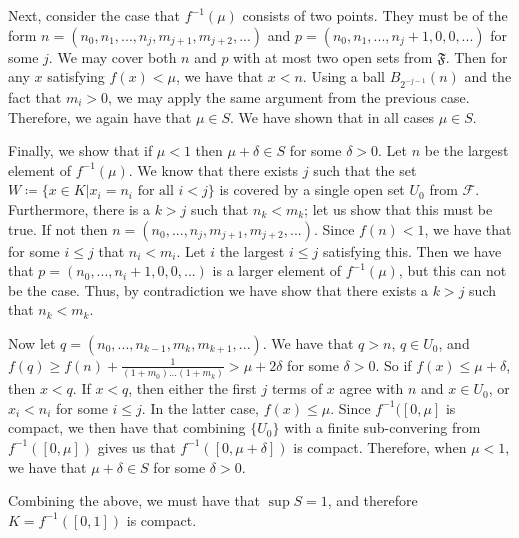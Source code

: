 Next, consider the case that \(f^{-1}(\mu)\) consists of two points. They must be of the form
\(n = (n_0, n_1, ..., n_j, m_{j+1}, m_{j+2}, ...)\) and \(p = (n_0, n_1, ..., n_j + 1, 0, 0, ...)\)
for some \(j\). We may cover both \(n\) and \(p\) with at most two open sets from \(\mathfrak F\). Then
for any \(x\) satisfying \(f(x) < \mu\), we have that \(x < n\). Using a ball \(B_{2^{-j-1}}(n)\) and the
fact that \(m_i > 0\), we may apply the same argument from the previous case. Therefore, we again have that
\(\mu \in S\). We have shown that in all cases \(\mu \in S\). 

Finally, we show that if \(\mu < 1\) then \(\mu + \delta \in S\) for some \(\delta > 0\). Let \(n\) be the
largest element of \(f^{-1}(\mu)\). We know that there exists \(j\) such that the set
\(W \coloneqq \{x \in K | x_i = n_i \text{ for all } i < j\}\) is covered by a single open set \(U_0\) from
\(\mathcal F\). Furthermore, there is a \(k > j\) such that \(n_k < m_k\); let us show that this must be true.
If not then \(n = (n_0, ..., n_j, m_{j+1}, m_{j+2}, ...)\). Since \(f(n) < 1\), we have that for some
\(i \leq j\) that \(n_i < m_i\). Let \(i\) the largest \(i \leq j\) satisfying this. Then we have that
\(p = (n_0, ..., n_i + 1, 0, 0, ...)\) is a larger element of \(f^{-1}(\mu)\), but this can not be the case. Thus,
by contradiction we have show that there exists a \(k > j\) such that \(n_k < m_k\). 

Now let \(q = (n_0, ..., n_{k-1}, m_k, m_{k+1}, ...)\). We have that \(q > n\), \(q \in U_0\), and 
\(f(q) \geq f(n) + \frac{1}{(1+m_0)...(1+m_k)} > \mu + 2\delta\) for some \(\delta > 0\). So if
\(f(x) \leq \mu + \delta\), then \(x < q\). If \(x < q\), then either the first \(j\) terms of \(x\) agree
with \(n\) and \(x \in U_0\), or \(x_i < n_i\) for some \(i \leq j\). In the latter case, \(f(x) \leq \mu\). 
Since \(f^{-1}([0, \mu]\) is compact, we then have that combining \(\{U_0\}\) with a finite sub-convering
from \(f^{-1}([0, \mu])\) gives us that \(f^{-1}([0, \mu + \delta])\) is compact. Therefore, when \(\mu < 1\),
we have that \(\mu + \delta \in S\) for some \(\delta > 0\).

Combining the above, we must have that \(\sup S = 1\), and therefore \(K = f^{-1}([0, 1])\) is compact.
